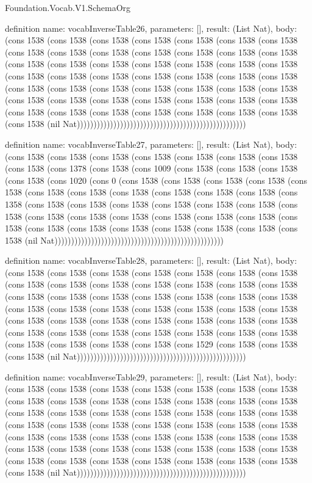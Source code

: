 \begin{lexlean}{Foundation.Vocab.V1.SchemaOrg}
\begin{semanticmodule}
definition{
  name: vocabInverseTable26,
  parameters: [],
  result: (List Nat),
  body: (cons 1538 (cons 1538 (cons 1538 (cons 1538 (cons 1538 (cons 1538 (cons 1538 (cons 1538 (cons 1538 (cons 1538 (cons 1538 (cons 1538 (cons 1538 (cons 1538 (cons 1538 (cons 1538 (cons 1538 (cons 1538 (cons 1538 (cons 1538 (cons 1538 (cons 1538 (cons 1538 (cons 1538 (cons 1538 (cons 1538 (cons 1538 (cons 1538 (cons 1538 (cons 1538 (cons 1538 (cons 1538 (cons 1538 (cons 1538 (cons 1538 (cons 1538 (cons 1538 (cons 1538 (cons 1538 (cons 1538 (cons 1538 (cons 1538 (cons 1538 (cons 1538 (cons 1538 (cons 1538 (cons 1538 (cons 1538 (cons 1538 (cons 1538 (nil Nat)))))))))))))))))))))))))))))))))))))))))))))))))))
}

definition{
  name: vocabInverseTable27,
  parameters: [],
  result: (List Nat),
  body: (cons 1538 (cons 1538 (cons 1538 (cons 1538 (cons 1538 (cons 1538 (cons 1538 (cons 1538 (cons 1378 (cons 1538 (cons 1009 (cons 1538 (cons 1538 (cons 1538 (cons 1538 (cons 1020 (cons 0 (cons 1538 (cons 1538 (cons 1538 (cons 1538 (cons 1538 (cons 1538 (cons 1538 (cons 1538 (cons 1538 (cons 1538 (cons 1538 (cons 1358 (cons 1538 (cons 1538 (cons 1538 (cons 1538 (cons 1538 (cons 1538 (cons 1538 (cons 1538 (cons 1538 (cons 1538 (cons 1538 (cons 1538 (cons 1538 (cons 1538 (cons 1538 (cons 1538 (cons 1538 (cons 1538 (cons 1538 (cons 1538 (cons 1538 (nil Nat)))))))))))))))))))))))))))))))))))))))))))))))))))
}

definition{
  name: vocabInverseTable28,
  parameters: [],
  result: (List Nat),
  body: (cons 1538 (cons 1538 (cons 1538 (cons 1538 (cons 1538 (cons 1538 (cons 1538 (cons 1538 (cons 1538 (cons 1538 (cons 1538 (cons 1538 (cons 1538 (cons 1538 (cons 1538 (cons 1538 (cons 1538 (cons 1538 (cons 1538 (cons 1538 (cons 1538 (cons 1538 (cons 1538 (cons 1538 (cons 1538 (cons 1538 (cons 1538 (cons 1538 (cons 1538 (cons 1538 (cons 1538 (cons 1538 (cons 1538 (cons 1538 (cons 1538 (cons 1538 (cons 1538 (cons 1538 (cons 1538 (cons 1538 (cons 1538 (cons 1538 (cons 1538 (cons 1538 (cons 1538 (cons 1538 (cons 1529 (cons 1538 (cons 1538 (cons 1538 (nil Nat)))))))))))))))))))))))))))))))))))))))))))))))))))
}

definition{
  name: vocabInverseTable29,
  parameters: [],
  result: (List Nat),
  body: (cons 1538 (cons 1538 (cons 1538 (cons 1538 (cons 1538 (cons 1538 (cons 1538 (cons 1538 (cons 1538 (cons 1538 (cons 1538 (cons 1538 (cons 1538 (cons 1538 (cons 1538 (cons 1538 (cons 1538 (cons 1538 (cons 1538 (cons 1538 (cons 1538 (cons 1538 (cons 1538 (cons 1538 (cons 1538 (cons 1538 (cons 1538 (cons 1538 (cons 1538 (cons 1538 (cons 1538 (cons 1538 (cons 1538 (cons 1538 (cons 1538 (cons 1538 (cons 1538 (cons 1538 (cons 1538 (cons 1538 (cons 1538 (cons 1538 (cons 1538 (cons 1538 (cons 1538 (cons 1538 (cons 1538 (cons 1538 (cons 1538 (cons 1538 (nil Nat)))))))))))))))))))))))))))))))))))))))))))))))))))
}


\end{semanticmodule}
\end{lexlean}
